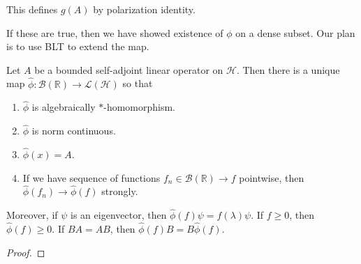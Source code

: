 \documentclass[12pt]{article}
\theoremstyle{plain}
\theoremstyle{definition}
\theoremstyle{named}
\newcommand{\shB}{\mathscr{B}}
\newcommand{\shH}{\mathscr{H}}
\newcommand{\shL}{\mathscr{L}}
\newcommand{\<}{\langle}
\renewcommand{\>}{\rangle}
\def\what{\widehat}
\newcommand{\IR}{\mathbb{R}}
\begin{document}
This defines $g(A)$ by polarization identity. 

If these are true, then we have showed existence of $\phi$ on a dense subset. Our plan is to use BLT to extend the map.  


Let $A$ be a bounded self-adjoint linear operator on $\shH$. Then there is a unique map $\what{\phi} : \shB(\IR) \to \shL(\shH)$ so that 
\begin{enumerate}
\item $\what{\phi}$ is algebraically $*$-homomorphism. 
\item $\what{\phi}$ is norm continuous. 
\item $\what{\phi}(x) = A$. 
\item If we have sequence of functions $f_n \in \shB(\IR) \to f$ pointwise, then $ \what{\phi}(f_n) \to \what{\phi}(f) $ strongly. 
\end{enumerate}
Moreover, if $\psi$ is an eigenvector, then $\what{\phi}(f) \psi = f(\lambda) \psi$. If $f \ge 0$, then $\what{\phi}(f) \ge 0$. If $BA = AB$, then $\what{\phi}(f) B = B \what{\phi}(f)$. 


\begin{proof}

\end{proof}
\end{document}
